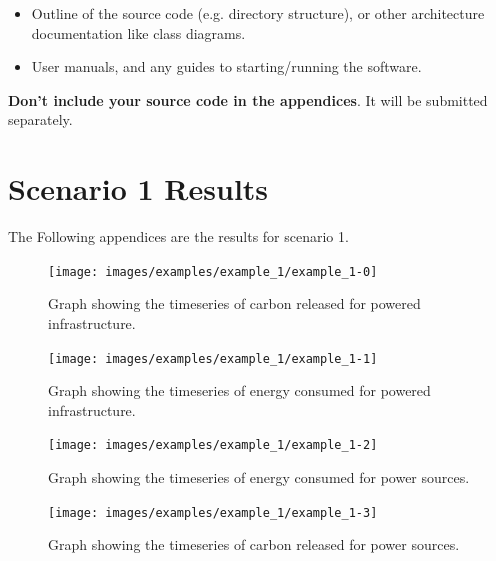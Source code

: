 \documentclass{l4proj}
\begin{document}
\begin{appendices}
\begin{itemize}
\item Outline of the source code (e.g. directory structure), or other architecture documentation like class diagrams.

\item User manuals, and any guides to starting/running the software.

\end{itemize}

\textbf{Don't include your source code in the appendices}. It will be
submitted separately.

\clearpage
\section{Scenario 1 Results}\label{apen:subsec:scen1}
The Following appendices are the results for scenario 1.
\clearpage
\begin{figure}[htbp]
    \centering
    \texttt{[image: images/examples/example\_1/example\_1-0]}
    ~
    \caption{Graph showing the timeseries of carbon released for powered infrastructure.}
    \label{fig:example1-0}
\end{figure}
\clearpage
\begin{figure}[htbp]
    \centering
    \texttt{[image: images/examples/example\_1/example\_1-1]}
    ~
    \caption{Graph showing the timeseries of energy consumed for powered infrastructure.}
    \label{fig:example1-1}
\end{figure}
\clearpage
\begin{figure}[htbp]
    \centering
    \texttt{[image: images/examples/example\_1/example\_1-2]}
    ~
    \caption{Graph showing the timeseries of energy consumed for power sources.}
    \label{fig:example1-2}
\end{figure}
\clearpage
\begin{figure}[htbp]
    \centering
    \texttt{[image: images/examples/example\_1/example\_1-3]}
    ~
    \caption{Graph showing the timeseries of carbon released for power sources.}
    \label{fig:example1-3}
\end{figure}

\clearpage

\end{appendices}
\end{document}
